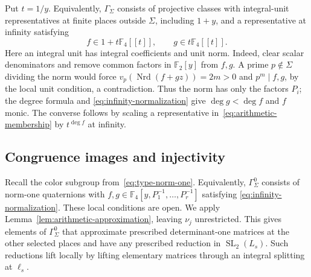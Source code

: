 \documentclass[11pt,letterpaper]{article}
\theoremstyle{definition}
\theoremstyle{remark}
\newcommand{\F}{\mathbb F}
\newcommand{\Nrd}{\operatorname{Nrd}}
\newcommand{\SL}{\operatorname{SL}}
\begin{document}
Put $t=1/y$. Equivalently, $\Gamma_\Sigma$ consists of projective
classes with integral-unit representatives at finite places outside
$\Sigma$, including $1+y$, and a representative at infinity satisfying
\begin{equation}
 f\in1+t\F_4[[t]],\qquad g\in t\F_4[[t]].
 \label{eq:infinity-normalization}
\end{equation}
Here an integral unit has integral coefficients and unit norm.
Indeed, clear scalar denominators and remove common factors in
$\F_2[y]$ from $f,g$. A prime $p\notin\Sigma$ dividing the norm
would force $v_p(\Nrd(f+gz))=2m>0$ and $p^m\mid f,g$, by the
local unit condition, a contradiction. Thus the norm has
only the factors $P_i$; the degree formula and
\eqref{eq:infinity-normalization} give $\deg g<\deg f$ and $f$ monic.
The converse follows by scaling a representative
in~\eqref{eq:arithmetic-membership} by $t^{\deg f}$ at infinity.

\subsection{Congruence images and injectivity}
\label{sec:quotient-injectivity}
Recall the color subgroup from~\eqref{eq:type-norm-one}.
Equivalently, $\Gamma_\Sigma^0$ consists of norm-one quaternions
with $f,g\in\F_4[y,P_1^{-1},\ldots,P_r^{-1}]$ satisfying
\eqref{eq:infinity-normalization}. These local conditions are open.
We apply Lemma~\ref{lem:arithmetic-approximation}, leaving
$\nu_j$ unrestricted. This gives elements of $\Gamma_\Sigma^0$
that approximate prescribed determinant-one matrices at the
other selected places and have any prescribed reduction
in $\SL_2(L_s)$.
Such reductions lift locally by lifting elementary matrices through
an integral splitting at $\ell_s$.
\end{document}

